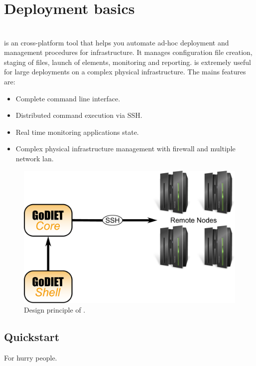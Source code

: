 \section{Deployment basics}
\label{sec:deployBasics}


\section{\godiet}
\label{sec:deployGoDIET}
\godiet is an cross-platform tool that helps you automate ad-hoc deployment and
management procedures for \diet infrastructure. It manages
configuration file creation, staging of files, launch of elements, monitoring
and reporting.  \godiet is extremely useful for large deployments on a complex
physical infrastructure. The mains features are:
\begin{itemize}
  \item Complete command line interface.
  \item Distributed command execution via SSH.
  \item Real time monitoring applications state.
  \item Complex physical infrastructure management with firewall and multiple
    network lan.
\end{itemize}
\begin{figure}[h]
  \centering
  \includegraphics[width=16cm]{fig/schemaPhilippe}
  \caption{Design principle of \godiet.\label{fig:GODIETDesign}}
\end{figure}

\subsection{Quickstart}
For hurry people.


